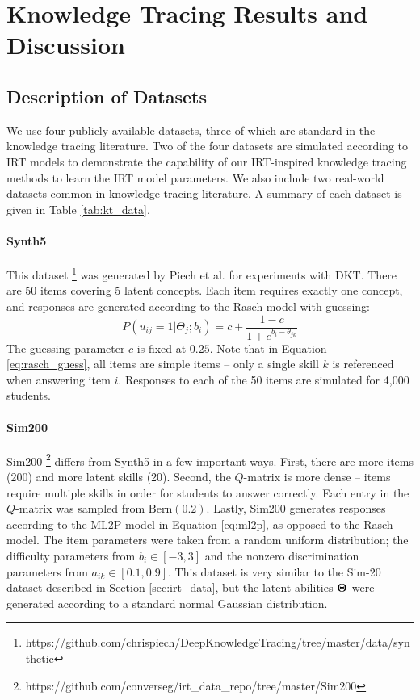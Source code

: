 \chapter{Knowledge Tracing Results and Discussion}

\section{Description of Datasets}\label{sec:kt_data}
We use four publicly available datasets, three of which are standard in the knowledge tracing literature. Two of the four datasets are simulated according to IRT models to demonstrate the capability of our IRT-inspired knowledge tracing methods to learn the IRT model parameters. We also include two real-world datasets common in knowledge tracing literature. A summary of each dataset is given in Table \ref{tab:kt_data}.

\subsubsection*{Synth5}
This dataset \footnote{https://github.com/chrispiech/DeepKnowledgeTracing/tree/master/data/synthetic} was generated by Piech et al. \cite{piech2015} for experiments with DKT. There are 50 items covering 5 latent concepts. Each item requires exactly one concept, and responses are generated according to the Rasch model \cite{lord1968} with guessing: 
\begin{equation}
  P(u_{ij} = 1| \Theta_j; b_i) = c + \frac{1-c}{1 + e^{b_i - \theta_{jk}}}
  \label{eq:rasch_guess}
\end{equation}
The guessing parameter $c$ is fixed at $0.25$. Note that in Equation \ref{eq:rasch_guess}, all items are simple items -- only a single skill $k$ is referenced when answering item $i$. Responses to each of the 50 items are simulated for 4,000 students.

\subsubsection*{Sim200}
Sim200 \footnote{https://github.com/converseg/irt\_data\_repo/tree/master/Sim200} differs from Synth5 in a few important ways. First, there are more items (200) and more latent skills (20). Second, the $Q$-matrix is more dense -- items require multiple skills in order for students to answer correctly. Each entry in the $Q$-matrix was sampled from $\text{Bern}(0.2)$. Lastly, Sim200 generates responses according to the ML2P model in Equation \ref{eq:ml2p}, as opposed to the Rasch model. The item parameters were taken from a random uniform distribution; the difficulty parameters from $b_i \in [-3,3]$ and the nonzero discrimination parameters from $a_{ik} \in [0.1,0.9]$. This dataset is very similar to the Sim-20 dataset described in Section \ref{sec:irt_data}, but the latent abilities $\boldsymbol{\Theta}$ were generated according to a standard normal Gaussian distribution.

